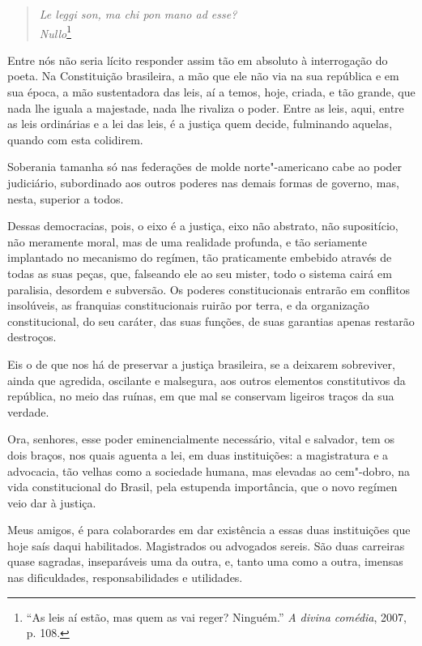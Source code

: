 \clearpage

\begin{verse}
\textit{Le leggi son, ma chi pon mano ad esse?}\\
\textit{Nullo}\footnote{ ``As leis aí estão, mas quem as vai reger?
Ninguém.'' \textit{A divina comédia}, 2007, p. 108.} 
\end{verse}

Entre nós não seria lícito responder assim tão em absoluto à
interrogação do poeta. Na Constituição brasileira, a mão que ele não
via na sua república e em sua época, a mão sustentadora das leis, aí a
temos, hoje, criada, e tão grande, que nada lhe iguala a majestade,
nada lhe rivaliza o poder. Entre as leis, aqui, entre as leis
ordinárias e a lei das leis, é a justiça quem decide, fulminando
aquelas, quando com esta colidirem.

Soberania tamanha só nas federações de molde norte"-americano cabe
ao poder judiciário, subordinado aos outros poderes nas demais formas
de governo, mas, nesta, superior a todos.

Dessas democracias, pois, o eixo é a justiça, eixo não abstrato,
não supositício, não meramente moral, mas de uma realidade profunda, e
tão seriamente implantado no mecanismo do regímen, tão praticamente
embebido através de todas as suas peças, que, falseando ele ao seu
mister, todo o sistema cairá em paralisia, desordem e subversão. Os
poderes constitucionais entrarão em conflitos insolúveis, as franquias
constitucionais ruirão por terra, e da organização constitucional, do
seu caráter, das suas funções, de suas garantias apenas restarão destroços.

Eis o de que nos há de preservar a justiça brasileira, se a
deixarem sobreviver, ainda que agredida, oscilante e malsegura, aos
outros elementos constitutivos da república, no meio das ruínas, em que
mal se conservam ligeiros traços da sua verdade.

Ora, senhores, esse poder eminencialmente necessário, vital e
salvador, tem os dois braços, nos quais aguenta a lei, em duas
instituições: a magistratura e a advocacia, tão velhas como a sociedade
humana, mas elevadas ao cem"-dobro, na vida constitucional do Brasil,
pela estupenda importância, que o novo regímen veio dar à justiça.

Meus amigos, é para colaborardes em dar existência a essas duas
instituições que hoje saís daqui habilitados. Magistrados ou advogados
sereis. São duas carreiras quase sagradas, inseparáveis uma da outra,
e, tanto uma como a outra, imensas nas dificuldades, responsabilidades
e utilidades.

